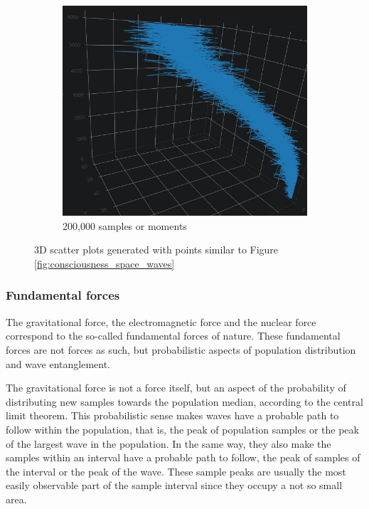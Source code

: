 \begin{figure}[H]
		\begin{subfigure}[H]{0.47\linewidth}
		\centering
		\includegraphics[width=1\linewidth]{sections/images/consciousness_space_3DScatter_200000-2.jpg}
		\caption{200,000 samples or moments}
		\label{fig:consciousness_space_3DScatter_200000-2}
		\end{subfigure}%
	\caption{3D scatter plots generated with points similar to Figure \ref{fig:consciousness_space_waves}}
	\end{figure}

\subsubsection{Fundamental forces}
The gravitational force, the electromagnetic force and the nuclear force correspond to the so-called fundamental forces of nature. These fundamental forces are not forces as such, but probabilistic aspects of population distribution and wave entanglement.

The gravitational force is not a force itself, but an aspect of the probability of distributing new samples towards the population median, according to the central limit theorem. This probabilistic sense makes waves have a probable path to follow within the population, that is, the peak of population samples or the peak of the largest wave in the population. In the same way, they also make the samples within an interval have a probable path to follow, the peak of samples of the interval or the peak of the wave. These sample peaks are usually the most easily observable part of the sample interval since they occupy a not so small area.

